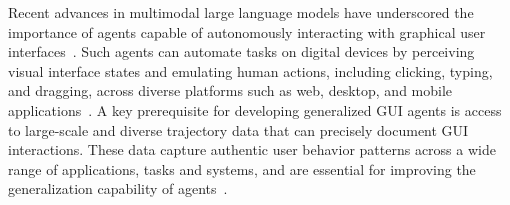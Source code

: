 \documentclass{article}
\theoremstyle{plain}
\theoremstyle{definition}
\theoremstyle{remark}
\newcommand{\lilei}[1]{\textcolor{orange}{#1 -lilei}}
\begin{document}
Recent advances in multimodal large language models have underscored the importance of agents capable of autonomously interacting with graphical user interfaces~\citep{zhang2024large,wang2025opencua,qin2025ui}. Such agents can automate tasks on digital devices by perceiving visual interface states and emulating human actions, including clicking, typing, and dragging, across diverse platforms such as web, desktop, and mobile applications~\citep{cheng2024seeclick, you2024ferret}. A key prerequisite for developing generalized GUI agents is access to large-scale and diverse trajectory data that can precisely document GUI interactions. These data capture authentic user behavior patterns across a wide range of applications, tasks and systems, and are essential for improving the generalization capability of agents~\citep{li2024effects, wu2024atlas, chen2025guicourse}. 
\end{document}
